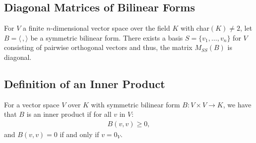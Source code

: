 \subsection{Diagonal Matrices of Bilinear Forms}

For $V$ a finite $n$-dimensional vector space over the field $K$ with char$(K) \neq 2$, 
let $B = \langle \, , \rangle$ be a symmetric bilinear form.
There exists a basis $S = \{v_1, \ldots, v_n\}$ for $V$ consisting of pairwise orthogonal
vectors and thus, the matrix $M_{SS}(B)$ is diagonal.

\subsection{Definition of an Inner Product}

For a vector space $V$ over $K$ with symmetric bilinear form $B : V \times V \to K$, we
have that $B$ is an inner product if for all $v$ in $V$: \begin{gather*}
  B(v, v) \geq 0,
\end{gather*} and $B(v, v) = 0$ if and only if $v = 0_V$.